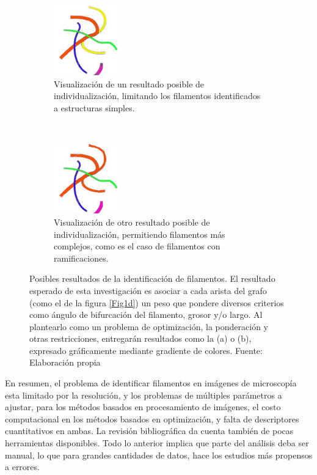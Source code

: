 \begin{figure}[h]
    \begin{subfigure}[t]{0.5\textwidth}
        \centering
        \includegraphics[height=1.2in]{imagenes/define-weighted-4-expected2.png}
        \caption{Visualizaci\'on de un resultado posible de individualizaci\'on, limitando los filamentos identificados a estructuras simples.}
        \label{Fig2a}
    \end{subfigure}
    ~ 
    \begin{subfigure}[t]{0.5\textwidth}
        \centering
        \includegraphics[height=1.2in]{imagenes/define-weighted-4-expected1.png}
        \caption{Visualizaci\'on de otro resultado posible de individualizaci\'on, permitiendo filamentos m\'as complejos, como es el caso de filamentos con ramificaciones. }
        \label{Fig2b}
    \end{subfigure}
	\caption{Posibles resultados de la identificaci\'on de filamentos. El resultado esperado de esta investigaci\'on es asociar a cada arista del grafo (como el de la figura \ref{Fig1d}) un peso que pondere diversos criterios como \'angulo de bifurcaci\'on del filamento, grosor y/o largo. Al plantearlo como un problema de optimizaci\'on, la ponderaci\'on y otras restricciones, entregar\'an resultados como la (a) o (b), expresado gr\'aficamente mediante gradiente de colores. Fuente: Elaboraci\'on propia}
\end{figure}

En resumen, el problema de identificar filamentos en im\'agenes de microscop\'ia esta limitado por la resoluci\'on, y los problemas de m\'ultiples par\'ametros a ajustar, para los m\'etodos basados en procesamiento de im\'agenes, el costo computacional en los m\'etodos basados en optimizaci\'on, y falta de descriptores cuantitativos en ambas. La revisi\'on bibliogr\'afica da cuenta tambi\'en de pocas herramientas disponibles. Todo lo anterior implica que parte del an\'alisis deba ser manual, lo que para grandes cantidades de datos, hace los estudios m\'as propensos a errores. 

